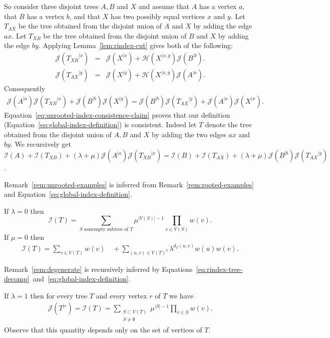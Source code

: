 \documentclass[11 pt]{modarticle}
\newcommand{\wmap}{w}
\newcommand{\size}[1]{|#1|}
\newcommand{\vsetof}[1]{V(#1)}
\newcommand{\distance}[3]{d_{#3}(#1,#2)}
\newcommand{\rtree}[2]{{#1}^{\lvert #2}}
\newcommand{\indexsymbol}{\mathcal{I}}
\newcommand{\tindex}[1]{\indexsymbol(#1)}
\newcommand{\rindexsymbol}{\mathcal{J}}
\newcommand{\rindex}[2]{\rindexsymbol(\rtree{#2}{#1})}
\newcommand{\aindexsymbol}{\mathcal{H}}
\newcommand{\aindex}[3]{\aindexsymbol(\rtree{#3}{#1, #2})}
\begin{document}
So consider three disjoint trees $A, B$ and $X$ and assume that $A$ has a vertex $a$, that $B$ has a vertex $b$, and that $X$ has two possibly equal vertices $x$ and $y$. Let $T_{AX}$ be the tree obtained from the disjoint union of $A$ and $X$ by adding the edge $ax$. Let $T_{XB}$ be the tree obtained from the disjoint union of $B$ and $X$ by adding the edge $by$. Applying Lemma~\ref{lem:rindex-cut} gives both of the following:
\begin{eqnarray*}
	\rindex{x}{T_{XB}} & = & \rindex{x}{X} + \aindex{x}{y}{X} \rindex{b}{B}. \\
	\rindex{y}{T_{AX}} & = & \rindex{y}{X} + \aindex{x}{y}{X} \rindex{a}{A}.
\end{eqnarray*} 
Consequently
\begin{eqnarray}
	\rindex{a}{A} \rindex{x}{T_{XB}} + \rindex{b}{B} \rindex{y}{X} = \rindex{b}{B} \rindex{y}{T_{AX}} + \rindex{a}{A} \rindex{x}{X}. \label{eq:unrooted-index-consistence-claim}
\end{eqnarray}
Equation~\eqref{eq:unrooted-index-consistence-claim} proves that our definition (Equation~\eqref{eq:global-index-definition}) is consistent. Indeed let $T$ denote the tree obtained from the disjoint union of $A,B$ and $X$ by adding the two edges $ax$ and $by$. We recursively get $\tindex{A} + \tindex{T_{XB}} + (\lambda + \mu) \rindex{a}{A} \rindex{x}{T_{XB}} = \tindex{B} + \tindex{T_{AX}} + (\lambda + \mu) \rindex{b}{B} \rindex{y}{T_{AX}}$.

Remark~\ref{rem:unrooted-examples} is inferred from Remark~\ref{rem:rooted-examples} and Equation~\eqref{eq:global-index-definition}.

\begin{rem}\label{rem:unrooted-examples}
If $\lambda = 0$ then
\[ \tindex{T} = \sum_{\text{$S$ nonempty subtree of $T$}}\mu^{\size{\vsetof{S}}-1} \underset{v \in \vsetof{S}}{\prod} \wmap(v).\]
If $\mu = 0$ then 
\begin{eqnarray*}
	\tindex{T} = {\sum_{v\in\vsetof{T}} \wmap(v) } \quad + \sum_{(u,v)\in\vsetof{T}^2} \lambda^{\distance{u}{v}{T}} \wmap(u) \wmap(v).
\end{eqnarray*}
\end{rem}

Remark~\ref{rem:degenerate} is recursively inferred by Equations~\eqref{eq:rindex-tree-decomp}~and~\eqref{eq:global-index-definition}.

\begin{rem}\label{rem:degenerate}
If $\lambda = 1$ then for every tree $T$ and every vertex $r$ of $T$ we have
\begin{eqnarray*}
	\rindex{r}{T} = \tindex{T} = \sum_{\substack{S \subset \vsetof{T}\\S\neq \emptyset}} \mu^{\size{S}-1} \underset{v \in S}{\prod} \wmap(v).
\end{eqnarray*}
Observe that this quantity depends only on the set of vertices of $T$.
\end{rem}
\end{document}
